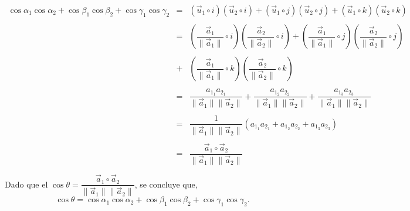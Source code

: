 \begin{itemize}
	$$\begin{array}{rcl}
	    \cos \alpha_1\cos \alpha_2+\cos \beta_1\cos \beta_2+ \cos \gamma_1\cos \gamma_2 &=& \left(\vec{u}_1\circ i\right)\left(\vec{u}_2\circ i\right)+\left(\vec{u}_1\circ j\right)\left(\vec{u}_2\circ j\right)+\left(\vec{u}_1\circ k\right)\left(\vec{u}_2\circ k\right)\\\\
											    &=&\left(\dfrac{\vec{a}_1}{\|\vec{a}_1\|}\circ i\right)\left(\dfrac{\vec{a}_2}{\|\vec{a}_2\|}\circ i\right)+ \left(\dfrac{\vec{a}_1}{\|\vec{a}_1\|}\circ j\right)\left(\dfrac{\vec{a}_2}{\|\vec{a}_2\|}\circ j\right)\\\\
											    &+& \left(\dfrac{\vec{a}_1}{\|\vec{a}_1\|}\circ k\right)\left(\dfrac{\vec{a}_2}{\|\vec{a}_2\|}\circ k\right)\\\\
											    &=&\dfrac{a_{1_1}a_{2_1}}{\|\vec{a}_1\|\|\vec{a}_2\|} + \dfrac{a_{1_2}a_{2_2}}{\|\vec{a}_1\|\|\vec{a}_2\|} + \dfrac{a_{1_3}a_{2_3}}{\|\vec{a}_1\|\|\vec{a}_2\|}\\\\
											    &=&\dfrac{1}{\|\vec{a}_1\|\|\vec{a}_2\|}\left(a_{1_1}a_{2_1}+a_{1_2}a_{2_2}+a_{1_3}a_{2_3}\right)\\\\
											    &=&\dfrac{\vec{a}_1\circ \vec{a}_2}{\|\vec{a}_1\|\|\vec{a}_2\|}\\\\
	\end{array}$$
	Dado que el $\cos \theta = \dfrac{\vec{a}_1\circ \vec{a}_2}{\|\vec{a}_1\|\|\vec{a}_2\|}$, se concluye que,
	$$\cos \theta = \cos \alpha_1\cos \alpha_2+\cos \beta_1\cos \beta_2+ \cos \gamma_1\cos \gamma_2.$$

\end{itemize}

